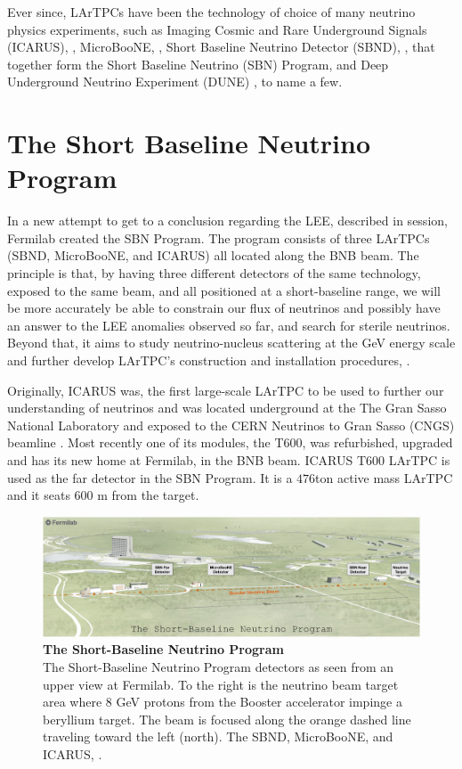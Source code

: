 Ever since, LArTPCs have been the technology of choice of many neutrino physics experiments, such as  Imaging Cosmic and Rare Underground Signals (ICARUS), \cite{ICARUS_proposal}, MicroBooNE, \cite{microboone_proposal}, Short Baseline Neutrino Detector (SBND), \cite{SBND}, that together form the Short Baseline Neutrino (SBN) Program, and Deep Underground Neutrino Experiment (DUNE) \cite{dune_snowmass_22}, to name a few. 

\section{The Short Baseline Neutrino Program}

In a new attempt to get to a conclusion regarding the LEE, described in session, Fermilab created the SBN Program. The program consists of three LArTPCs (SBND, MicroBooNE, and ICARUS) all located along the BNB beam. The principle is that, by having three different detectors of the same technology, exposed to the same beam, and all positioned at a short-baseline range, we will be more accurately be able to constrain our flux of neutrinos and possibly have an answer to the LEE anomalies observed so far, and search for sterile neutrinos. Beyond that, it aims to study neutrino-nucleus scattering at the GeV energy scale and further develop LArTPC's construction and installation procedures, \cite{SBN}.

Originally, ICARUS was, the first large-scale LArTPC to be used to further our understanding of neutrinos and was located underground at the The Gran Sasso National Laboratory and exposed to the CERN Neutrinos to Gran Sasso (CNGS) beamline \cite{ICARUS_proposal}. Most recently one of its modules, the T600, was refurbished, upgraded and has its new home at Fermilab, in the BNB beam. ICARUS T600 LArTPC is used as the far detector in the SBN Program. It is a $476$ton active mass LArTPC and it seats $600$ m from the target. 

\begin{figure}[h!]
	\begin{center}
		\includegraphics[scale=0.32]{Figures/SBN.png}
		\caption[The Short-Baseline Neutrino Program]{\textbf{The Short-Baseline Neutrino Program}\\The Short-Baseline Neutrino Program detectors as seen from an upper view at Fermilab. To the right is the neutrino beam target area where $8$ GeV protons from the Booster accelerator impinge a beryllium target. The beam is focused along the orange dashed line traveling toward the left (north). The SBND, MicroBooNE, and ICARUS, \cite{SBN}.
		}
		\label{sbn_program}
	\end{center}
\end{figure}

